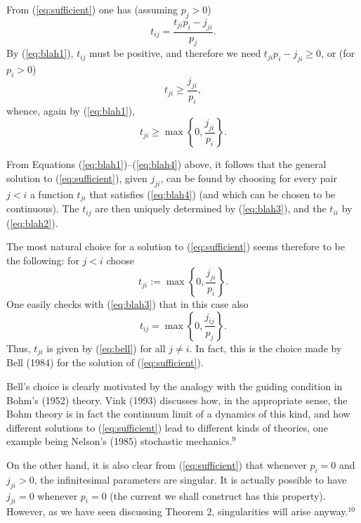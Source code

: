 \documentclass[12pt]{article}
\newcommand{\be}{\begin{equation}}
\newcommand{\ee}{\end{equation}}
\begin{document}
From (\ref{eq:sufficient}) one has (assuming $p_j>0$)
\be
\label{eq:blah3}
t_{ij}=\frac{t_{ji}p_i-j_{ji}}{p_j}.
\ee
By (\ref{eq:blah1}), $t_{ij}$ must be positive, and therefore we need
$t_{ji}p_i-j_{ji}\geq 0$, or (for $p_i>0$)
\be
t_{ji}\geq\frac{j_{ji}}{p_i},
\ee
whence, again by (\ref{eq:blah1}),
\be
\label{eq:blah4}
t_{ji}\geq\max \left\{ { 0,\frac{j_{ji}}{p_i} } \right\}.
\ee

From Equations (\ref{eq:blah1})--(\ref{eq:blah4}) above, it follows 
that the general solution to (\ref{eq:sufficient}), given $j_{ji}$, 
can be found by choosing for every pair $j<i$ a function $t_{ji}$ that 
satisfies (\ref{eq:blah4}) (and which can be chosen to be continuous).  
The $t_{ij}$ are then uniquely determined by (\ref{eq:blah3}), and the 
$t_{ii}$ by (\ref{eq:blah2}).

The most natural choice for a solution to (\ref{eq:sufficient}) seems 
therefore to be the following: for $j<i$ choose
\be
\label{eq:bell}
t_{ji}:=\max \left\{ { 0,\frac{j_{ji}}{p_i} } \right\}.
\ee
One easily checks with
(\ref{eq:blah3}) that in this case also
\be
t_{ij}=\max \left\{ { 0,\frac{j_{ij}}{p_j} } \right\}.
\ee
Thus, $t_{ji}$ is given by (\ref{eq:bell}) for all $j\neq i$.  In fact,
this is the choice made by Bell (1984) for the solution of
(\ref{eq:sufficient}).

Bell's choice is clearly motivated by the analogy with the guiding 
condition in Bohm's (1952) theory.  Vink (1993) discusses how, in the 
appropriate sense, the Bohm theory is in fact the continuum limit of a 
dynamics of this kind, and how different solutions to 
(\ref{eq:sufficient}) lead to different kinds of theories, one example 
being Nelson's (1985) stochastic mechanics.$^9$

On the other hand, it is also clear from (\ref{eq:sufficient}) that 
whenever $p_i=0$ and $j_{ji}>0$, the infinitesimal parameters are 
singular.  It is actually possible to have $j_{ji}=0$ whenever $p_i=0$ 
(the current we shall construct has this property).  However, as we 
have seen discussing Theorem 2, singularities will arise 
anyway.$^{10}$
\end{document}
